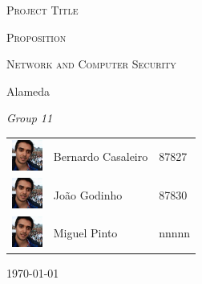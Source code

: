 \documentclass[a4paper,titlepage,11pt]{article}
\begin{document}
\begin{titlepage}
\begin{center}
  {\scshape \huge Project Title \par}
  \vspace{1cm}

  {\scshape \LARGE Proposition \par}
  \vspace{1.5cm}

  {\scshape \Large Network and Computer Security \par}
  \vspace{0.5cm}

  {\Large Alameda \par}
  \vfill

  {\itshape \Large Group 11 \par}
  \vfill

\begin{tabular}{l l l}
  \includegraphics[width=10mm, height=10mm]{img/bernardo.jpeg} & Bernardo Casaleiro & 87827\\
  \includegraphics[width=10mm, height=10mm]{img/bernardo.jpeg} & João Godinho & 87830\\                       %
  \includegraphics[width=10mm, height=10mm]{img/bernardo.jpeg} & Miguel Pinto & nnnnn\\                       %
\end{tabular}
  \vfill

{\large \today\par}
\end{center}
\end{titlepage}
\end{document}
